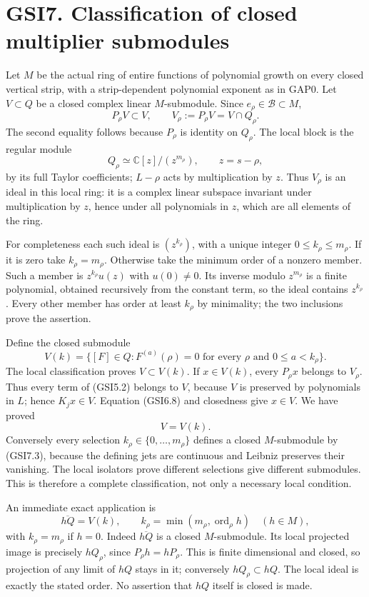 \section{GSI7. Classification of closed multiplier
submodules}\label{gsi7.-classification-of-closed-multiplier-submodules}

Let \(M\) be the actual ring of entire functions of polynomial growth on
every closed vertical strip, with a strip-dependent polynomial exponent
as in GAP0. Let \(V\subset Q\) be a closed complex linear
\(M\)-submodule. Since \(e_\rho\in\mathcal B\subset M\), \[
P_\rho V\subset V,\qquad
V_\rho:=P_\rho V=V\cap Q_\rho.
\tag{GSI7.1}
\] The second equality follows because \(P_\rho\) is identity on
\(Q_\rho\). The local block is the regular module \[
Q_\rho\simeq\mathbb C[z]/(z^{m_\rho}),\qquad z=s-\rho,
\tag{GSI7.2}
\] by its full Taylor coefficients; \(L-\rho\) acts by multiplication by
\(z\). Thus \(V_\rho\) is an ideal in this local ring: it is a complex
linear subspace invariant under multiplication by \(z\), hence under all
polynomials in \(z\), which are all elements of the ring.

For completeness each such ideal is \((z^{k_\rho})\), with a unique
integer \(0\le k_\rho\le m_\rho\). If it is zero take \(k_\rho=m_\rho\).
Otherwise take the minimum order of a nonzero member. Such a member is
\(z^{k_\rho}u(z)\) with \(u(0)\ne0\). Its inverse modulo \(z^{m_\rho}\)
is a finite polynomial, obtained recursively from the constant term, so
the ideal contains \(z^{k_\rho}\). Every other member has order at least
\(k_\rho\) by minimality; the two inclusions prove the assertion.

Define the closed submodule \[
V(k)=\{[F]\in Q:F^{(a)}(\rho)=0
\text{ for every }\rho\text{ and }0\le a<k_\rho\}.
\tag{GSI7.3}
\] The local classification proves \(V\subset V(k)\). If \(x\in V(k)\),
every \(P_\rho x\) belongs to \(V_\rho\). Thus every term of (GSI5.2)
belongs to \(V\), because \(V\) is preserved by polynomials in \(L\);
hence \(K_jx\in V\). Equation (GSI6.8) and closedness give \(x\in V\).
We have proved \[
\boxed{V=V(k).}
\tag{GSI7.4}
\] Conversely every selection \(k_\rho\in\{0,\ldots,m_\rho\}\) defines a
closed \(M\)-submodule by (GSI7.3), because the defining jets are
continuous and Leibniz preserves their vanishing. The local isolators
prove different selections give different submodules. This is therefore
a complete classification, not only a necessary local condition.

An immediate exact application is \[
\overline{hQ}=V(k),\qquad
k_\rho=\min(m_\rho,\operatorname{ord}_\rho h)
\quad(h\in M),
\tag{GSI7.5}
\] with \(k_\rho=m_\rho\) if \(h=0\). Indeed \(\overline{hQ}\) is a
closed \(M\)-submodule. Its local projected image is precisely
\(hQ_\rho\), since \(P_\rho h=hP_\rho\). This is finite dimensional and
closed, so projection of any limit of \(hQ\) stays in it; conversely
\(hQ_\rho\subset hQ\). The local ideal is exactly the stated order. No
assertion that \(hQ\) itself is closed is made.

